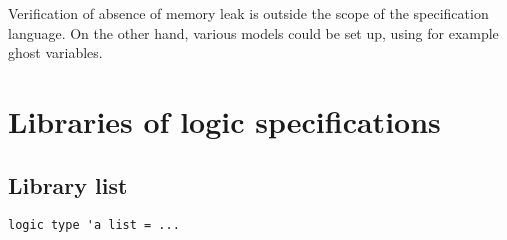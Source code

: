 \experimental

Verification of absence of memory leak is outside the scope of the
specification language. On the other hand, various models could be set
up, using for example ghost variables.


\section{Libraries of logic specifications}
\label{sec:speclibraries}

\subsection{Library list}

\begin{verbatim}
logic type 'a list = ...
\end{verbatim}

